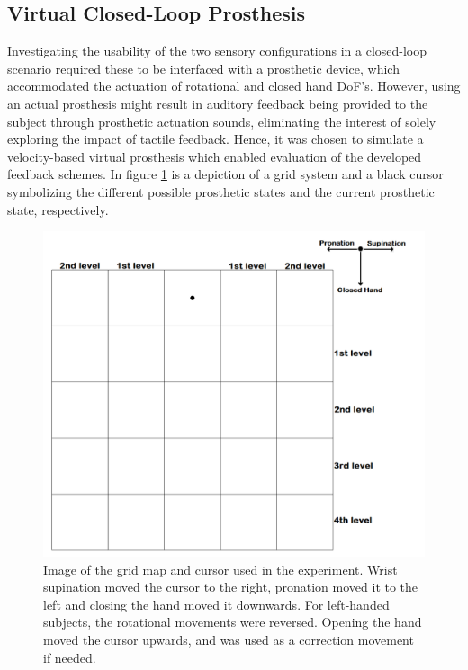 

\subsection{Virtual Closed-Loop Prosthesis}

Investigating the usability of the two sensory configurations in a closed-loop scenario required these to be interfaced with a prosthetic device, which accommodated the actuation of rotational and closed hand DoF's. However, using an actual prosthesis might result in auditory feedback being provided to the subject through prosthetic actuation sounds, eliminating the interest of solely exploring the impact of tactile feedback. Hence, it was chosen to simulate a velocity-based virtual prosthesis which enabled evaluation of the developed feedback schemes. In figure \ref{fig:pa:gridmap} is a depiction of a grid system and a black cursor symbolizing the different possible prosthetic states and the current prosthetic state, respectively.
\begin{figure}[h]                 
	\includegraphics[width=1\textwidth]{figures/gridmap2}  
	\caption{Image of the grid map and cursor used in the experiment. Wrist supination moved the cursor to the right, pronation moved it to the left and closing the hand moved it downwards. For left-handed subjects, the rotational movements were reversed. Opening the hand moved the cursor upwards, and was used as a correction movement if needed.}
	\label{fig:pa:gridmap} 
\end{figure}
